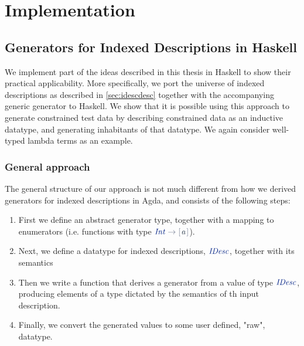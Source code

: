 \documentclass[a4paper,msc,twosized=semi]{uustthesis}
\newcommand*{\mathcolor}{}
\def\mathcolor#1#{\mathcoloraux{#1}}
\newcommand*{\mathcoloraux}[3]{%
  \protect\leavevmode
  \begingroup
    \color#1{#2}#3%
  \endgroup
}
\newcommand{\HSSpecial}[1]{\mathcolor{hsblue4}{#1}}
\newcommand{\HSSym}[1]{\mathcolor{hsblue4}{#1}}
\newcommand{\HSCon}[1]{\mathcolor{hsblue3}{\mathit{#1}}}
\newcommand{\HSVar}[1]{\mathcolor{hsblue5}{\mathit{#1}}}
\begin{document}

\part{Implementation}

\chapter{Generators for Indexed Descriptions in Haskell}
We implement part of the ideas described in this thesis in Haskell to show their 
practical applicability. More specifically, we port the universe of indexed 
descriptions as described in \cref{sec:idescdesc} together with the accompanying 
generic generator to Haskell. We show that it is possible using this approach to 
generate constrained test data by describing constrained data as an inductive datatype,
 and generating inhabitants of that datatype. We again consider well-typed lambda 
 terms as an example. 

\section{General approach}

  The general structure of our approach is not much different from how we derived 
  generators for indexed descriptions in Agda, and consists of the following steps: 

  \begin{enumerate}
    \item 
      First we define an abstract generator type, together with a mapping to 
      enumerators (i.e. functions with type \ensuremath{\HSCon{Int}\HSSym{\to} \HSSpecial{\HSSym{[\mskip1.5mu} }\HSVar{a}\HSSpecial{\HSSym{\mskip1.5mu]}}}). 

    \item 
      Next, we define a datatype for indexed descriptions, \ensuremath{\HSCon{IDesc}}, together with its 
      semantics

    \item 
      Then we write a function that derives a generator from a value of type \ensuremath{\HSCon{IDesc}}, 
      producing elements of a type dictated by the semantics of th input description. 

    \item 
      Finally, we convert the generated values to some user defined, "raw", datatype.  
  \end{enumerate}
\end{document}
